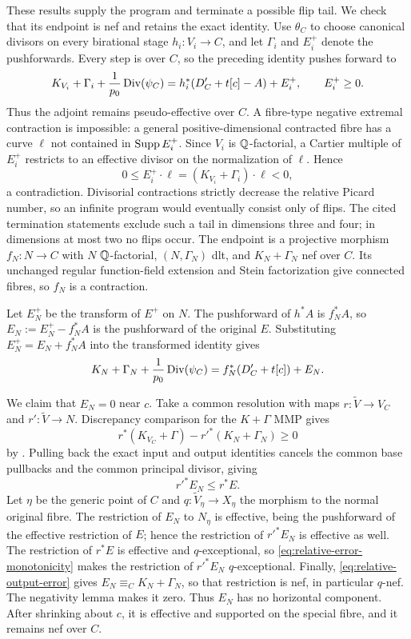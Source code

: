 These results supply the program and terminate a possible flip tail.
We check that its endpoint is nef and retains the exact identity.  Use
$\theta_C$ to choose canonical divisors on every birational stage
$h_i:V_i\to C$, and let $\Gamma_i$ and $E_i^+$ denote the pushforwards.
Every step is over $C$, so the preceding identity pushes forward to
\[
 K_{V_i}+\Gamma_i+\frac1{p_0}\operatorname{Div}(\psi_C)
     =h_i^*(D'_C+t[c]-A)+E_i^+,\qquad E_i^+\geq0.
\]
Thus the adjoint remains pseudo-effective over $C$.  A fibre-type negative
extremal contraction is impossible: a general positive-dimensional
contracted fibre has a curve $\ell$ not contained in $\operatorname{Supp} E_i^+$.
Since $V_i$ is $\mathbb Q$-factorial, a Cartier multiple of $E_i^+$ restricts
to an effective divisor on the normalization of $\ell$.  Hence
\[
 0\leq E_i^+\cdot\ell=(K_{V_i}+\Gamma_i)\cdot\ell<0,
\]
a contradiction.  Divisorial contractions strictly decrease the relative
Picard number, so an infinite program would eventually consist only of
flips.  The cited termination statements exclude such a tail in dimensions
three and four; in dimensions at most two no flips occur.  The endpoint is
a projective morphism $f_N:N\to C$ with $N$ $\mathbb Q$-factorial,
$(N,\Gamma_N)$ dlt, and $K_N+\Gamma_N$ nef over $C$.  Its unchanged regular
function-field extension and Stein factorization give connected fibres,
so $f_N$ is a contraction.

Let $E_N^+$ be the transform of $E^+$ on $N$.  The pushforward of
$h^*A$ is $f_N^*A$, so
$E_N:=E_N^+-f_N^*A$ is the pushforward of the original $E$.  Substituting
$E_N^+=E_N+f_N^*A$ into the transformed identity gives
\begin{equation}\label{eq:relative-output-error}
 K_N+\Gamma_N+\frac1{p_0}\operatorname{Div}(\psi_C)
   =f_N^*(D'_C+t[c])+E_N.
\end{equation}

We claim that $E_N=0$ near $c$.  Take a common resolution with maps
$r:\widetilde V\to V_C$ and $r':\widetilde V\to N$.  Discrepancy
comparison for the $K+\Gamma$ MMP gives
\[
 r^*(K_{V_C}+\Gamma)-r'^*(K_N+\Gamma_N)\geq0
\]
by \cite[Lemmas~3.38--3.39]{KollarMori1998}.  Pulling back the exact input
and output identities cancels the common base pullbacks and the common
principal divisor, giving
\begin{equation}\label{eq:relative-error-monotonicity}
 r'^*E_N\leq r^*E.
\end{equation}
Let $\eta$ be the generic point of $C$ and
$q:\widetilde V_\eta\to X_\eta$ the morphism to the normal original fibre.
The restriction of $E_N$ to $N_\eta$ is effective, being the pushforward
of the effective restriction of $E$; hence the restriction of $r'^*E_N$
is effective as well.  The restriction of $r^*E$ is effective and
$q$-exceptional, so \eqref{eq:relative-error-monotonicity} makes the
restriction of $r'^*E_N$ $q$-exceptional.  Finally,
\eqref{eq:relative-output-error} gives
$E_N\equiv_C K_N+\Gamma_N$, so that restriction is nef, in particular
$q$-nef.  The negativity lemma makes it zero.  Thus $E_N$ has no
horizontal component.  After shrinking about $c$, it is effective and
supported on the special fibre, and it remains nef over $C$.

